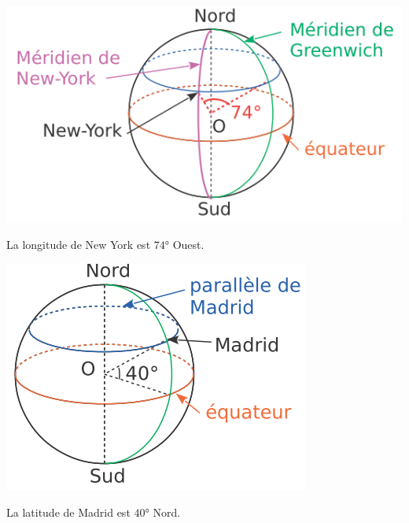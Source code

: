 \documentclass[12pt,a4paper]{article}
\begin{document}
\begin{myex}
	\begin{multicols}{2}
		\begin{center}
			\includegraphics[scale=0.5]{img/terre1}
		\end{center}
		La longitude de New York est $74$° Ouest.
		
		\begin{center}
			\includegraphics[scale=0.5]{img/terre2}
		\end{center}
		La latitude de Madrid est $40$° Nord.
	\end{multicols}
\end{myex}
\end{document}
